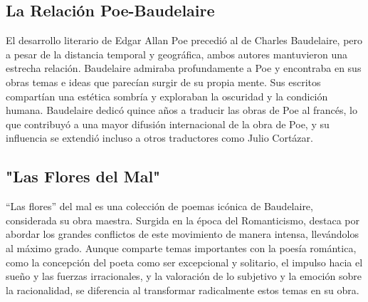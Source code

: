 \documentclass{article}
\begin{document}
\subsection{La Relación Poe-Baudelaire}

El desarrollo literario de Edgar Allan Poe precedió al de Charles Baudelaire, pero a pesar de la distancia temporal y geográfica, ambos autores mantuvieron una estrecha relación. Baudelaire admiraba profundamente a Poe y encontraba en sus obras temas e ideas que parecían surgir de su propia mente. Sus escritos compartían una estética sombría y exploraban la oscuridad y la condición humana. Baudelaire dedicó quince años a traducir las obras de Poe al francés, lo que contribuyó a una mayor difusión internacional de la obra de Poe, y su influencia se extendió incluso a otros traductores como Julio Cortázar. 

\subsection{"Las Flores del Mal"}

``Las flores'' del mal es una colección de poemas icónica de Baudelaire, considerada su obra maestra. Surgida en la época del Romanticismo, destaca por abordar los grandes conflictos de este movimiento de manera intensa, llevándolos al máximo grado. Aunque comparte temas importantes con la poesía romántica, como la concepción del poeta como ser excepcional y solitario, el impulso hacia el sueño y las fuerzas irracionales, y la valoración de lo subjetivo y la emoción sobre la racionalidad, se diferencia al transformar radicalmente estos temas en su obra.
\end{document}
